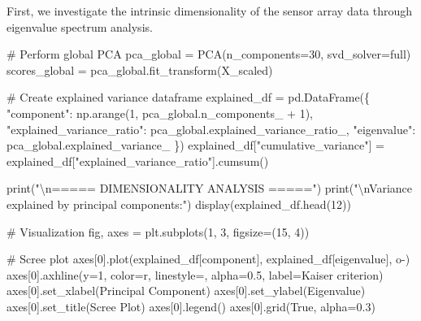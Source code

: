 \documentclass[
  letterpaper,
  DIV=11,
  numbers=noendperiod]{scrartcl}
\newenvironment{Shaded}{\begin{snugshade}}{\end{snugshade}}
\newcommand{\BuiltInTok}[1]{\textcolor[rgb]{0.00,0.23,0.31}{#1}}
\newcommand{\CharTok}[1]{\textcolor[rgb]{0.13,0.47,0.30}{#1}}
\newcommand{\CommentTok}[1]{\textcolor[rgb]{0.37,0.37,0.37}{#1}}
\newcommand{\DecValTok}[1]{\textcolor[rgb]{0.68,0.00,0.00}{#1}}
\newcommand{\FloatTok}[1]{\textcolor[rgb]{0.68,0.00,0.00}{#1}}
\newcommand{\NormalTok}[1]{\textcolor[rgb]{0.00,0.23,0.31}{#1}}
\newcommand{\OperatorTok}[1]{\textcolor[rgb]{0.37,0.37,0.37}{#1}}
\newcommand{\StringTok}[1]{\textcolor[rgb]{0.13,0.47,0.30}{#1}}
\newcommand{\VariableTok}[1]{\textcolor[rgb]{0.07,0.07,0.07}{#1}}
\renewenvironment{Shaded}{%
  \begin{tcolorbox}[%
    enhanced,%
    colback=codebg,%
    colframe=codebg,%
    borderline west={3pt}{0pt}{sectionblue},%
    fontupper=\small\ttfamily,%
    boxrule=0pt,%
    arc=0pt,%
    boxsep=5pt,%
    left=2mm,%
    right=2mm,%
    top=2mm,%
    bottom=2mm%
  ]%
}{%
  \end{tcolorbox}%
}
\begin{document}
First, we investigate the intrinsic dimensionality of the sensor array
data through eigenvalue spectrum analysis.

\begin{Shaded}
\begin{Highlighting}[]
\CommentTok{\# Perform global PCA}
\NormalTok{pca\_global }\OperatorTok{=}\NormalTok{ PCA(n\_components}\OperatorTok{=}\DecValTok{30}\NormalTok{, svd\_solver}\OperatorTok{=}\StringTok{\textquotesingle{}full\textquotesingle{}}\NormalTok{)}
\NormalTok{scores\_global }\OperatorTok{=}\NormalTok{ pca\_global.fit\_transform(X\_scaled)}

\CommentTok{\# Create explained variance dataframe}
\NormalTok{explained\_df }\OperatorTok{=}\NormalTok{ pd.DataFrame(\{}
    \StringTok{"component"}\NormalTok{: np.arange(}\DecValTok{1}\NormalTok{, pca\_global.n\_components\_ }\OperatorTok{+} \DecValTok{1}\NormalTok{),}
    \StringTok{"explained\_variance\_ratio"}\NormalTok{: pca\_global.explained\_variance\_ratio\_,}
    \StringTok{"eigenvalue"}\NormalTok{: pca\_global.explained\_variance\_}
\NormalTok{\})}
\NormalTok{explained\_df[}\StringTok{"cumulative\_variance"}\NormalTok{] }\OperatorTok{=}\NormalTok{ explained\_df[}\StringTok{"explained\_variance\_ratio"}\NormalTok{].cumsum()}

\BuiltInTok{print}\NormalTok{(}\StringTok{"}\CharTok{\textbackslash{}n}\StringTok{===== DIMENSIONALITY ANALYSIS ====="}\NormalTok{)}
\BuiltInTok{print}\NormalTok{(}\StringTok{"}\CharTok{\textbackslash{}n}\StringTok{Variance explained by principal components:"}\NormalTok{)}
\NormalTok{display(explained\_df.head(}\DecValTok{12}\NormalTok{))}

\CommentTok{\# Visualization}
\NormalTok{fig, axes }\OperatorTok{=}\NormalTok{ plt.subplots(}\DecValTok{1}\NormalTok{, }\DecValTok{3}\NormalTok{, figsize}\OperatorTok{=}\NormalTok{(}\DecValTok{15}\NormalTok{, }\DecValTok{4}\NormalTok{))}

\CommentTok{\# Scree plot}
\NormalTok{axes[}\DecValTok{0}\NormalTok{].plot(explained\_df[}\StringTok{\textquotesingle{}component\textquotesingle{}}\NormalTok{], explained\_df[}\StringTok{\textquotesingle{}eigenvalue\textquotesingle{}}\NormalTok{], }\StringTok{\textquotesingle{}o{-}\textquotesingle{}}\NormalTok{)}
\NormalTok{axes[}\DecValTok{0}\NormalTok{].axhline(y}\OperatorTok{=}\DecValTok{1}\NormalTok{, color}\OperatorTok{=}\StringTok{\textquotesingle{}r\textquotesingle{}}\NormalTok{, linestyle}\OperatorTok{=}\StringTok{\textquotesingle{}{-}{-}\textquotesingle{}}\NormalTok{, alpha}\OperatorTok{=}\FloatTok{0.5}\NormalTok{, label}\OperatorTok{=}\StringTok{\textquotesingle{}Kaiser criterion\textquotesingle{}}\NormalTok{)}
\NormalTok{axes[}\DecValTok{0}\NormalTok{].set\_xlabel(}\StringTok{\textquotesingle{}Principal Component\textquotesingle{}}\NormalTok{)}
\NormalTok{axes[}\DecValTok{0}\NormalTok{].set\_ylabel(}\StringTok{\textquotesingle{}Eigenvalue\textquotesingle{}}\NormalTok{)}
\NormalTok{axes[}\DecValTok{0}\NormalTok{].set\_title(}\StringTok{\textquotesingle{}Scree Plot\textquotesingle{}}\NormalTok{)}
\NormalTok{axes[}\DecValTok{0}\NormalTok{].legend()}
\NormalTok{axes[}\DecValTok{0}\NormalTok{].grid(}\VariableTok{True}\NormalTok{, alpha}\OperatorTok{=}\FloatTok{0.3}\NormalTok{)}


\end{Highlighting}
\end{Shaded}
\end{document}
